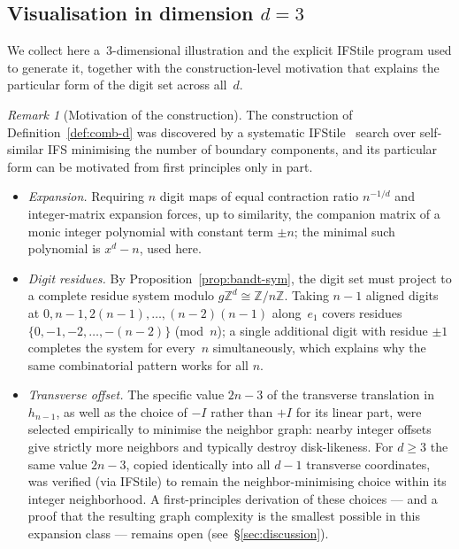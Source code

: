\documentclass{amsart}
\theoremstyle{definition}
\theoremstyle{remark}
\newtheorem{remark}[theorem]{Remark}
\newcommand{\Z}{\mathbb{Z}}
\begin{document}
\subsection{Visualisation in dimension $d = 3$}
\label{ssec:visual-3d}

We collect here a~$3$-dimensional illustration and the explicit
IFStile program used to generate it, together with the
construction-level motivation that explains the particular form
of the digit set across all~$d$.

\begin{remark}[Motivation of the construction]
The construction of Definition~\ref{def:comb-d} was discovered by
a systematic IFStile~\cite{ifstile} search over self-similar IFS
minimising the number of boundary components, and its particular
form can be motivated from first principles only in part.
\begin{itemize}
\item \emph{Expansion.} Requiring $n$ digit maps of equal
  contraction ratio $n^{-1/d}$ and integer-matrix expansion
  forces, up to similarity, the companion matrix of a monic
  integer polynomial with constant term $\pm n$; the minimal
  such polynomial is $x^d - n$, used here.
\item \emph{Digit residues.} By Proposition~\ref{prop:bandt-sym},
  the digit set must project to a complete residue system modulo
  $g\Z^d \cong \Z/n\Z$.  Taking $n{-}1$ aligned digits at
  $0, n{-}1, 2(n{-}1), \ldots, (n{-}2)(n{-}1)$ along~$e_1$
  covers residues $\{0, -1, -2, \ldots, -(n{-}2)\}$
  (mod~$n$); a single additional digit with residue $\pm 1$
  completes the system for every~$n$ simultaneously, which
  explains why the same combinatorial pattern works for all $n$.
\item \emph{Transverse offset.} The specific value $2n{-}3$ of
  the transverse translation in $h_{n-1}$, as well as the choice
  of $-I$ rather than $+I$ for its linear part, were selected
  empirically to minimise the neighbor graph: nearby integer
  offsets give strictly more neighbors and typically destroy
  disk-likeness.  For $d \ge 3$ the same value $2n{-}3$, copied
  identically into all $d{-}1$ transverse coordinates, was
  verified (via IFStile) to remain the neighbor-minimising
  choice within its integer neighborhood.  A first-principles
  derivation of these choices --- and a proof that the resulting
  graph complexity is the smallest possible in this
  expansion class --- remains open
  (see~\S\ref{sec:discussion}).
\end{itemize}
\end{remark}
\end{document}
